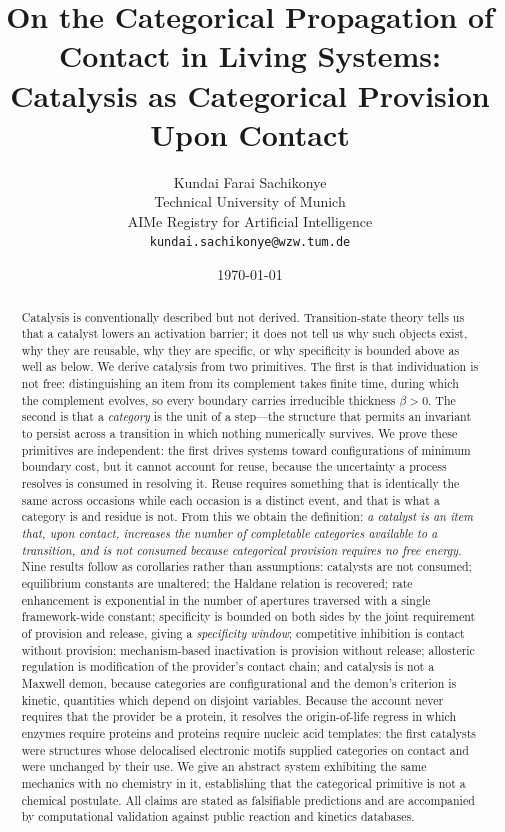 \documentclass[11pt,twocolumn,a4paper]{article}
\title{\textbf{On the Categorical Propagation of Contact in Living Systems:\\
Catalysis as Categorical Provision Upon Contact}}
\author{Kundai Farai Sachikonye\\
\small Technical University of Munich\\
\small AIMe Registry for Artificial Intelligence\\
\small \texttt{kundai.sachikonye@wzw.tum.de}}
\date{\today}
\theoremstyle{plain}
\theoremstyle{definition}
\theoremstyle{remark}
\newcommand{\thick}{\beta}
\begin{document}
\maketitle

\begin{abstract}
\noindent
Catalysis is conventionally described but not derived. Transition-state theory
tells us that a catalyst lowers an activation barrier; it does not tell us why
such objects exist, why they are reusable, why they are specific, or why
specificity is bounded above as well as below. We derive catalysis from two
primitives. The first is that individuation is not free: distinguishing an item
from its complement takes finite time, during which the complement evolves, so
every boundary carries irreducible thickness $\thick>0$. The second is that a
\emph{category} is the unit of a step---the structure that permits an invariant
to persist across a transition in which nothing numerically survives. We prove
these primitives are independent: the first drives systems toward configurations
of minimum boundary cost, but it cannot account for reuse, because the
uncertainty a process resolves is consumed in resolving it. Reuse requires
something that is identically the same across occasions while each occasion is a
distinct event, and that is what a category is and residue is not. From this we
obtain the definition: \emph{a catalyst is an item that, upon contact, increases
the number of completable categories available to a transition, and is not
consumed because categorical provision requires no free energy.} Nine results
follow as corollaries rather than assumptions: catalysts are not consumed;
equilibrium constants are unaltered; the Haldane relation is recovered; rate
enhancement is exponential in the number of apertures traversed with a single
framework-wide constant; specificity is bounded on both sides by the joint
requirement of provision and release, giving a \emph{specificity window};
competitive inhibition is contact without provision; mechanism-based
inactivation is provision without release; allosteric regulation is
modification of the provider's contact chain; and catalysis is not a Maxwell
demon, because categories are configurational and the demon's criterion is
kinetic, quantities which depend on disjoint variables. Because the account
never requires that the provider be a protein, it resolves the origin-of-life
regress in which enzymes require proteins and proteins require nucleic acid
templates: the first catalysts were structures whose delocalised electronic
motifs supplied categories on contact and were unchanged by their use. We give
an abstract system exhibiting the same mechanics with no chemistry in it,
establishing that the categorical primitive is not a chemical postulate. All
claims are stated as falsifiable predictions and are accompanied by
computational validation against public reaction and kinetics databases.
\end{abstract}
\end{document}
